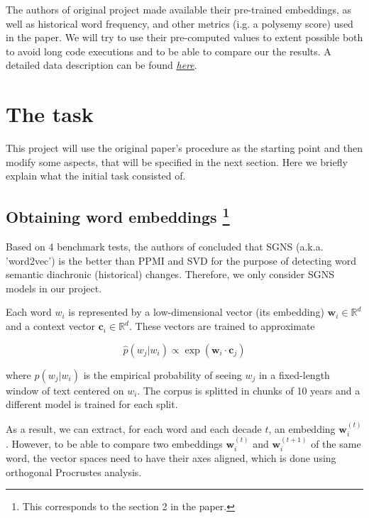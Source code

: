 \documentclass[11pt, twocolumn]{extarticle}
\newcommand{\word}[1]{w_{#1}}
\newcommand{\emb}[1]{\mathbf{w}_{#1}}
\newcommand{\embt}[2]{\mathbf{w}^{(#2)}_{#1}}
\newcommand{\ctx}[1]{\mathbf{c}_{#1}}
\begin{document}
The authors of original project made available their pre-trained embeddings, as well as historical word frequency, and other metrics (i.g. a polysemy score) used in the paper. We will try to use their pre-computed values to extent possible both to avoid long code executions and to be able to compare our the results. A detailed data description can be found \href{https://nlp.stanford.edu/projects/histwords/data_description.html}{\textit{here}}.  
\par

\section{The task}

This project will use the original paper's procedure as the starting point and then modify some aspects, that will be specified in the next section. Here we briefly explain what the initial task consisted of. 
\par

\subsection*{Obtaining word embeddings \footnote{This corresponds to the section 2 in the paper.}}

Based on 4 benchmark tests, the authors of \cite{hamilton-etal-2016-diachronic} concluded that SGNS (a.k.a. 'word2vec') is the better than PPMI and SVD for the purpose of detecting word semantic diachronic (historical) changes. Therefore, we only consider SGNS models in our project.
\par

Each word $\word{i}$ is represented by a low-dimensional vector (its embedding) $\emb{i} \in \mathbb{R}^{d}$  and a context vector $\ctx{i} \in \mathbb{R}^{d}$. These vectors are trained to approximate

\begin{equation}
    \hat{p}\left(w_{j} | w_{i}\right) \propto \exp \left(\mathbf{w}_{i} \cdot \mathbf{c}_{j}\right)
\end{equation}

where $\hat{p}\left(w_{j} | w_{i}\right)$ is the empirical probability of seeing $\word{j}$ in a fixed-length window of text centered on $\word{i}$. The corpus is splitted in chunks of 10 years and a different model is trained for each split. 
\par

As a result, we can extract, for each word and each decade $t$, an embedding $\embt{i}{t}$. However, to be able to compare two embeddings $\embt{i}{t}$ and $\embt{i}{t + 1}$ of the same word, the vector spaces need to have their axes aligned, which is done using orthogonal Procrustes analysis. 
\par
\end{document}
